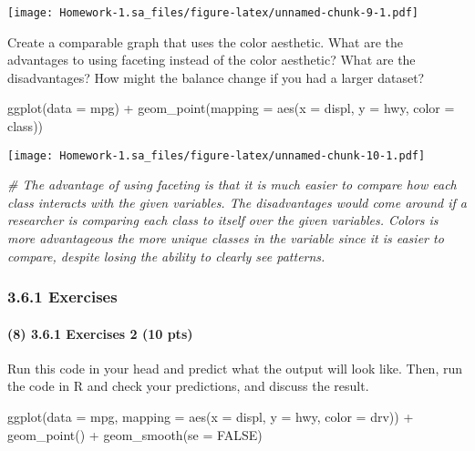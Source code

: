 \documentclass[
]{article}
\newenvironment{Shaded}{\begin{snugshade}}{\end{snugshade}}
\newcommand{\AttributeTok}[1]{\textcolor[rgb]{0.77,0.63,0.00}{#1}}
\newcommand{\CommentTok}[1]{\textcolor[rgb]{0.56,0.35,0.01}{\textit{#1}}}
\newcommand{\ConstantTok}[1]{\textcolor[rgb]{0.00,0.00,0.00}{#1}}
\newcommand{\FunctionTok}[1]{\textcolor[rgb]{0.00,0.00,0.00}{#1}}
\newcommand{\NormalTok}[1]{#1}
\newcommand{\SpecialCharTok}[1]{\textcolor[rgb]{0.00,0.00,0.00}{#1}}
\begin{document}
\texttt{[image: Homework-1.sa\_files/figure-latex/unnamed-chunk-9-1.pdf]}

Create a comparable graph that uses the color aesthetic. What are the
advantages to using faceting instead of the color aesthetic? What are
the disadvantages? How might the balance change if you had a larger
dataset?

\begin{Shaded}
\begin{Highlighting}[]
\FunctionTok{ggplot}\NormalTok{(}\AttributeTok{data =}\NormalTok{ mpg) }\SpecialCharTok{+} 
  \FunctionTok{geom\_point}\NormalTok{(}\AttributeTok{mapping =} \FunctionTok{aes}\NormalTok{(}\AttributeTok{x =}\NormalTok{ displ, }\AttributeTok{y =}\NormalTok{ hwy, }\AttributeTok{color =}\NormalTok{ class))}
\end{Highlighting}
\end{Shaded}

\texttt{[image: Homework-1.sa\_files/figure-latex/unnamed-chunk-10-1.pdf]}

\begin{Shaded}
\begin{Highlighting}[]
\CommentTok{\# The advantage of using faceting is that it is much easier to compare how each class interacts with the given variables. The disadvantages would come around if a researcher is comparing each class to itself over the given variables. Colors is more advantageous the more unique classes in the variable since it is easier to compare, despite losing the ability to clearly see patterns.}
\end{Highlighting}
\end{Shaded}

\hypertarget{exercises-3}{%
\subsubsection{3.6.1 Exercises}\label{exercises-3}}

\hypertarget{exercises-2-10-pts}{%
\paragraph{(8) 3.6.1 Exercises 2 (10 pts)}\label{exercises-2-10-pts}}

Run this code in your head and predict what the output will look like.
Then, run the code in R and check your predictions, and discuss the
result.

\begin{Shaded}
\begin{Highlighting}[]
\FunctionTok{ggplot}\NormalTok{(}\AttributeTok{data =}\NormalTok{ mpg, }\AttributeTok{mapping =} \FunctionTok{aes}\NormalTok{(}\AttributeTok{x =}\NormalTok{ displ, }\AttributeTok{y =}\NormalTok{ hwy, }\AttributeTok{color =}\NormalTok{ drv)) }\SpecialCharTok{+} 
  \FunctionTok{geom\_point}\NormalTok{() }\SpecialCharTok{+} 
  \FunctionTok{geom\_smooth}\NormalTok{(}\AttributeTok{se =} \ConstantTok{FALSE}\NormalTok{)}
\end{Highlighting}
\end{Shaded}
\end{document}

